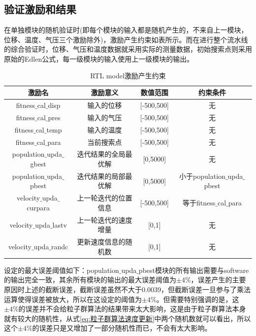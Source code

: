 \subsection{验证激励和结果}
在单独模块的随机验证时(即每个模块的输入都是随机产生的，不来自上一模块，位移、温度、气压三个激励除外)，激励产生约束如表所示。而在进行整个流水线的综合验证时，位移、气压和温度数据就采用实际的测量数据，初始搜索点则采用原始的Edlen公式，每一级模块的输入使用上一级模块的输出。
\begin{table}[H]
  \centering
  \caption{RTL model激励产生约束}
  \label{tab:RTL model激励产生约束}
  \begin{tabular}{c|c|c|c}
      \hline
      激励名                             & 激励意义                   &  数值范围       & 约束条件  \\ \hline
      fitness$\_$cal$\_$disp            & 输入的位移                  &  [-500,500]     & 无      \\ \hline
      fitness$\_$cal$\_$pres            & 输入的气压                  &  [-500,500]     & 无      \\ \hline
      fitness$\_$cal$\_$temp            & 输入的温度                  &  [-500,500]     & 无      \\ \hline
      fitness$\_$cal$\_$para            & 当前搜索点                  &  [-500,500]     & 无      \\ \hline
      population$\_$upda$\_$gbest       & 迭代结果的全局最优解         &  [0,5000]       & 无       \\ \hline
      population$\_$upda$\_$pbest       & 迭代结果的局部最优解         &  [0,5000]       &小于population$\_$upda$\_$pbest \\ \hline
      velocity$\_$upda$\_$curpara       & 上一轮迭代的位置信息         & [-500,500]      & 等于fitness$\_$cal$\_$para     \\ \hline
      velocity$\_$upda$\_$lastv         & 上一轮迭代的速度增量         & [0,1]           & 无     \\ \hline
      velocity$\_$upda$\_$randc         & 更新速度信息的随机数         & [0,1]           & 无     \\ \hline
  \end{tabular}
\end{table}

设定的最大误差阈值如下：population$\_$upda$\_$pbest模块的所有输出需要与software的输出完全一致，其余所有模块的输出的最大误差阈值为$\pm4\%$，误差产生的主要原因时上述的截断误差，截断误差虽然不大于0.0039，但截断误差一旦参与了乘法运算使得误差被放大，所以在这设定的阈值为$\pm4\%$。但需要特别强调的是，这$\pm4\%$的误差并不会给粒子群算法的结果带来太大影响，这是由于粒子群算法本身就有较大的随机性，从式\eqref{eq:粒子群算法速度更新}中两个随机数就可以看出，所以这个$\pm4\%$的误差只是又增加了一部分随机性而已，不会有太大影响。

